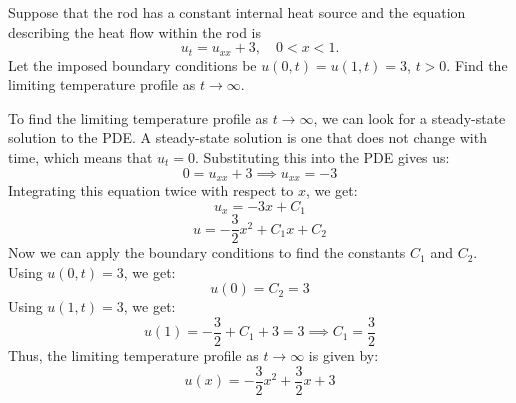 \documentclass[12pt]{article}
\begin{document}
\begin{center}
\end{center}


Suppose that the rod has a constant internal heat source and the equation describing the heat flow within the rod is
\[
u_t = u_{xx} + 3, \quad 0 < x < 1.
\]
Let the imposed boundary conditions be $u(0,t) = u(1,t) = 3$, $t > 0$. Find the limiting temperature profile as $t \to \infty$.

\sol
To find the limiting temperature profile as $t \to \infty$, we can look for a steady-state solution to the PDE. A steady-state solution is one that does not change with time, which means that $u_t = 0$. Substituting this into the PDE gives us:
\[
0 = u_{xx} + 3
\implies u_{xx} = -3
\]
Integrating this equation twice with respect to $x$, we get:
\[
u_x = -3x + C_1
\]
\[
u = -\frac{3}{2}x^2 + C_1 x + C_2
\]
Now we can apply the boundary conditions to find the constants $C_1$ and $C_2$. Using $u(0,t) = 3$, we get:
\[
u(0) = C_2 = 3
\]
Using $u(1,t) = 3$, we get:
\[
u(1) = -\frac{3}{2} + C_1 + 3 = 3 \implies C_1 = \frac{3}{2}
\]
Thus, the limiting temperature profile as $t \to \infty$ is given by:
\[
\boxed{
u(x) = -\frac{3}{2}x^2 + \frac{3}{2}x + 3}
\]
\end{document}
